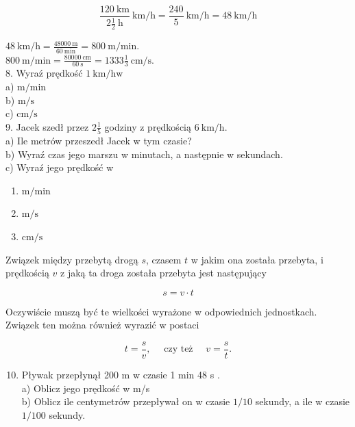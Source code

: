 \documentclass[10pt]{article}
\begin{document}
\[
\frac{120 \mathrm{~km}}{2 \frac{1}{2} \mathrm{~h}} \mathrm{~km} / \mathrm{h}=\frac{240}{5} \mathrm{~km} / \mathrm{h}=48 \mathrm{~km} / \mathrm{h}
\]

\(48 \mathrm{~km} / \mathrm{h}=\frac{48000 \mathrm{~m}}{60 \mathrm{~min}}=800 \mathrm{~m} / \mathrm{min}\).\\
\(800 \mathrm{~m} / \mathrm{min}=\frac{80000 \mathrm{~cm}}{60 \mathrm{~s}}=1333 \frac{1}{3} \mathrm{~cm} / \mathrm{s}\).\\
8. Wyraź prędkość \(1 \mathrm{~km} / \mathrm{h} \mathrm{w}\)\\
a) \(\mathrm{m} / \mathrm{min}\)\\
b) \(\mathrm{m} / \mathrm{s}\)\\
c) \(\mathrm{cm} / \mathrm{s}\)\\
9. Jacek szedł przez \(2 \frac{1}{5}\) godziny z prędkością \(6 \mathrm{~km} / \mathrm{h}\).\\
a) Ile metrów przeszedł Jacek w tym czasie?\\
b) Wyraź czas jego marszu w minutach, a następnie w sekundach.\\
c) Wyraź jego prędkość w

\begin{enumerate}
  \item \(\mathrm{m} / \mathrm{min}\)
  \item \(\mathrm{m} / \mathrm{s}\)
  \item \(\mathrm{cm} / \mathrm{s}\)
\end{enumerate}

Związek między przebytą drogą \(s\), czasem \(t\) w jakim ona została przebyta, i prędkością \(v\) z jaką ta droga została przebyta jest następujący

\[
s=v \cdot t
\]

Oczywiście muszą być te wielkości wyrażone w odpowiednich jednostkach. Związek ten można również wyrazić w postaci

\[
t=\frac{s}{v}, \quad \text { czy też } \quad v=\frac{s}{t} .
\]

\begin{enumerate}
  \setcounter{enumi}{9}
  \item Pływak przepłynął 200 m w czasie 1 min 48 s .\\
a) Oblicz jego prędkość w m/s\\
b) Oblicz ile centymetrów przepływał on w czasie \(1 / 10\) sekundy, a ile w czasie \(1 / 100\) sekundy.
\end{enumerate}
\end{document}
